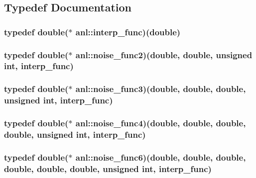 \subsection{Typedef Documentation}
\hypertarget{namespaceanl_a2c8cd5d25499b47ef49c82dea75ba8dd}{
\subsubsection[{interp\_\-func}]{\setlength{\rightskip}{0pt plus 5cm}typedef double($\ast$ {\bf anl::interp\_\-func})(double)}}
\label{namespaceanl_a2c8cd5d25499b47ef49c82dea75ba8dd}
\hypertarget{namespaceanl_afde4e91ea2a8d75a93c4abe8c7eacd83}{
\subsubsection[{noise\_\-func2}]{\setlength{\rightskip}{0pt plus 5cm}typedef double($\ast$ {\bf anl::noise\_\-func2})(double, double, unsigned int, {\bf interp\_\-func})}}
\label{namespaceanl_afde4e91ea2a8d75a93c4abe8c7eacd83}
\hypertarget{namespaceanl_a92b0e78f6459c949d2f7b08a91b843e5}{
\subsubsection[{noise\_\-func3}]{\setlength{\rightskip}{0pt plus 5cm}typedef double($\ast$ {\bf anl::noise\_\-func3})(double, double, double, unsigned int, {\bf interp\_\-func})}}
\label{namespaceanl_a92b0e78f6459c949d2f7b08a91b843e5}
\hypertarget{namespaceanl_a3482023bba3cc79a7a5e569d38aa7259}{
\subsubsection[{noise\_\-func4}]{\setlength{\rightskip}{0pt plus 5cm}typedef double($\ast$ {\bf anl::noise\_\-func4})(double, double, double, double, unsigned int, {\bf interp\_\-func})}}
\label{namespaceanl_a3482023bba3cc79a7a5e569d38aa7259}
\hypertarget{namespaceanl_a7e1d1c8ad49ec7a95b33a1a75b6ffbcb}{
\subsubsection[{noise\_\-func6}]{\setlength{\rightskip}{0pt plus 5cm}typedef double($\ast$ {\bf anl::noise\_\-func6})(double, double, double, double, double, double, unsigned int, {\bf interp\_\-func})}}
\label{namespaceanl_a7e1d1c8ad49ec7a95b33a1a75b6ffbcb}


